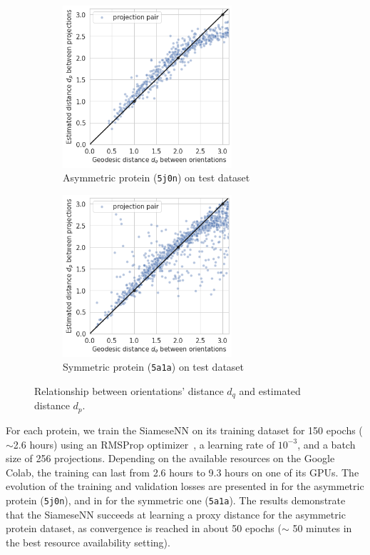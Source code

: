 \begin{figure}
    \centering
    \begin{subfigure}[b]{0.45\textwidth}
        \includegraphics[height=6cm]{images/dPdQ_5j0n.png}
        \caption{Asymmetric protein (\texttt{5j0n}) on test dataset}
    \end{subfigure}
    \hfill
    \begin{subfigure}[b]{0.50\textwidth}
    \centering
        \includegraphics[height=6cm]{images/dPdQ_5a1a.png}
        \caption{Symmetric protein (\texttt{5a1a}) on test dataset}
    \end{subfigure}
    \caption{Relationship between orientations' distance $d_q$ and estimated distance $d_p$.}
    \label{fig:learned-distance-siamese}
\end{figure}


For each protein, we train the SiameseNN on its training dataset for 150 epochs ($\sim$2.6 hours) using an RMSProp optimizer~\cite{noauthor_tfkerasoptimizersrmsprop_nodate}, a learning rate of $10^{-3}$, and a batch size of 256 projections. 
Depending on the available resources on the Google Colab, the training can last from 2.6 hours to 9.3 hours on one of its GPUs.
The evolution of the training and validation losses are presented in  for the asymmetric protein (\texttt{5j0n}), and in  for the symmetric one (\texttt{5a1a}).
The results demonstrate that the SiameseNN succeeds at learning a proxy distance for the asymmetric protein dataset, as convergence is reached in about 50 epochs ($\sim$ 50 minutes in the best resource availability setting).


